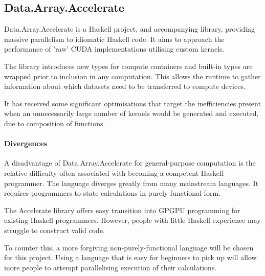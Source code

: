 \subsection{Data.Array.Accelerate}

Data.Array.Accelerate is a Haskell project\cite{daa}, and accompanying library\cite{daalib}, providing massive parallelism to idiomatic Haskell code. It aims to approach the performance of 'raw' \ac{CUDA} implementations utilising custom kernels.

The library introduces new types for compute containers and built-in types are wrapped prior to inclusion in any computation. This allows the runtime to gather information about which datasets need to be transferred to compute devices.

It has received some significant optimisations\cite{daaopt} that target the inefficiencies present when an unnecessarily large number of kernels would be generated and executed, due to composition of functions.

\paragraph*{Divergences}
A disadvantage of Data.Array.Accelerate for general-purpose computation is the relative difficulty often associated with becoming a competent Haskell programmer. The language diverges greatly from many mainstream languages.  It requires programmers to state calculations in purely functional form.

The Accelerate library offers easy transition into \ac{GPGPU} programming for existing Haskell programmers. However, people with little Haskell experience may struggle to construct valid code.

 To counter this, a more forgiving non-purely-functional language will be chosen for this project. Using a language that is easy for beginners to pick up will allow more people to attempt parallelising execution of their calculations.
